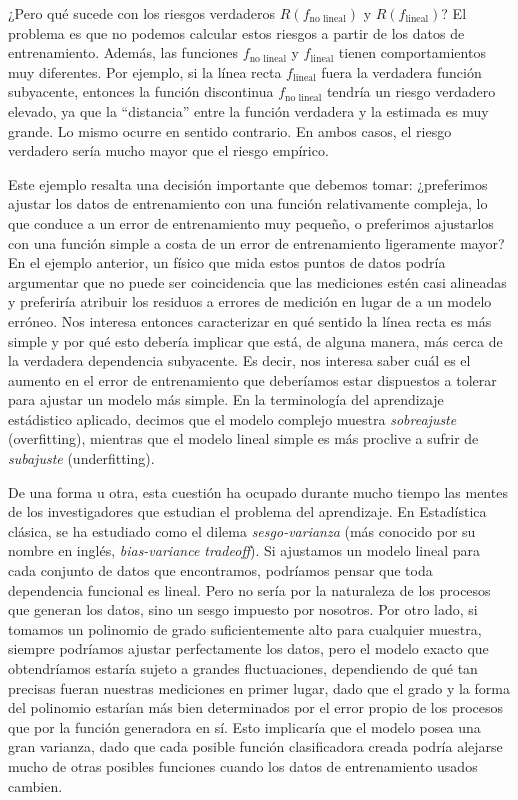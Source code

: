 \documentclass{report}
\begin{document}
¿Pero qué sucede con los riesgos verdaderos \(R(f_{\text{no lineal}})\) y \(R(f_{\text{lineal}})\)? 
El problema es que no podemos calcular estos riesgos a partir de los datos de entrenamiento. 
Además, las funciones \(f_{\text{no lineal}}\) y \(f_{\text{lineal}}\) tienen comportamientos muy diferentes. 
Por ejemplo, si la línea recta \(f_{\text{lineal}}\) fuera la verdadera función subyacente, 
entonces la función discontinua \(f_{\text{no lineal}}\) tendría un riesgo verdadero elevado, 
ya que la “distancia” entre la función verdadera y la estimada es muy grande. 
Lo mismo ocurre en sentido contrario. En ambos casos, el riesgo verdadero sería mucho mayor que el riesgo empírico.\newline


Este ejemplo resalta una decisión importante que debemos tomar: ¿preferimos ajustar los datos de entrenamiento 
con una función relativamente compleja, lo que conduce a un error de entrenamiento muy pequeño, o preferimos 
ajustarlos con una función simple a costa de un error de entrenamiento ligeramente mayor? En el ejemplo 
anterior, un físico que mida estos puntos de datos podría argumentar que no puede ser coincidencia que las mediciones 
estén casi alineadas y preferiría atribuir los residuos a errores de medición en lugar de a un modelo erróneo. Nos interesa
entonces caracterizar en qué sentido la línea recta es más simple y por qué esto debería implicar que está, de 
alguna manera, más cerca de la verdadera dependencia subyacente. Es decir, nos interesa saber cuál es el 
aumento en el error de entrenamiento que deberíamos estar dispuestos a tolerar para ajustar un modelo más simple. 
En la terminología del aprendizaje 
estádistico aplicado, decimos que el modelo complejo muestra \textit{sobreajuste} (overfitting), 
mientras que el modelo lineal simple es más proclive a sufrir de \textit{subajuste} (underfitting).\newline

De una forma u otra, esta cuestión ha ocupado durante mucho tiempo las mentes de los investigadores que estudian 
el problema del aprendizaje. En Estadística clásica, se ha estudiado como el dilema \textit{sesgo-varianza} 
(más conocido por su nombre en inglés, \textit{bias-variance tradeoff}). Si ajustamos un modelo lineal para cada conjunto de datos que encontramos, 
podríamos pensar que toda dependencia funcional es lineal. Pero no sería por la naturaleza de los procesos que
generan los datos, sino un sesgo impuesto por nosotros. Por otro lado, 
si tomamos un polinomio de grado suficientemente alto para cualquier muestra, siempre podríamos ajustar 
perfectamente los datos, pero el modelo exacto que obtendríamos estaría sujeto a grandes fluctuaciones, dependiendo 
de qué tan precisas fueran nuestras mediciones en primer lugar, dado que el grado y la forma del polinomio estarían más
bien determinados por el error propio de los procesos que por la función generadora en sí. Esto implicaría que el modelo 
posea una gran varianza, dado que cada posible función clasificadora creada podría alejarse mucho de otras posibles funciones 
cuando los datos de entrenamiento usados cambien.\newline
\end{document}
